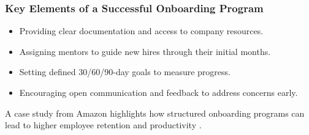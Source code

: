 \subsubsection{Key Elements of a Successful Onboarding Program}

\begin{itemize}
    \item Providing clear documentation and access to company resources.
    \item Assigning mentors to guide new hires through their initial months.
    \item Setting defined 30/60/90-day goals to measure progress.
    \item Encouraging open communication and feedback to address concerns early.
\end{itemize}

A case study from Amazon highlights how structured onboarding programs can lead to higher employee retention and productivity \cite{AmazonOnboarding}.

